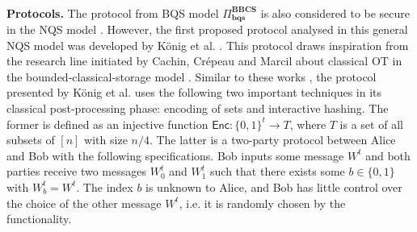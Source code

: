 
\

\noindent\textbf{Protocols.} The protocol from BQS model $\Pi^{\textbf{BBCS}}_{\textbf{bqs}}$ is also considered to be secure in the NQS model \cite{S10}. However, the first proposed protocol analysed in this general NQS model was developed by K\"onig et al. \cite{KWW12}. This protocol draws inspiration from the research line initiated by Cachin, Crépeau and Marcil \cite{CCM98} about classical OT in the bounded-classical-storage model \cite{DHRS04, S07}. Similar to these works \cite{CCM98, DHRS04, S07}, the protocol presented by K\"onig et al. \cite{KWW12} uses the following two important techniques in its classical post-processing phase: encoding of sets and interactive hashing. The former is defined as an injective function $\mathsf{Enc}: \{0,1\}^t \rightarrow T$, where $T$ is a set of all subsets of $[n]$ with size $n/4$. The latter is a two-party protocol between Alice and Bob with the following specifications. Bob inputs some message $W^t$ and both parties receive two messages $W^t_0$ and $W^t_1$ such that there exists some $b\in\{0,1\}$ with $W^t_b = W^t$. The index $b$ is unknown to Alice, and Bob has little control over the choice of the other message $W^t$, i.e. it is randomly chosen by the functionality. %


